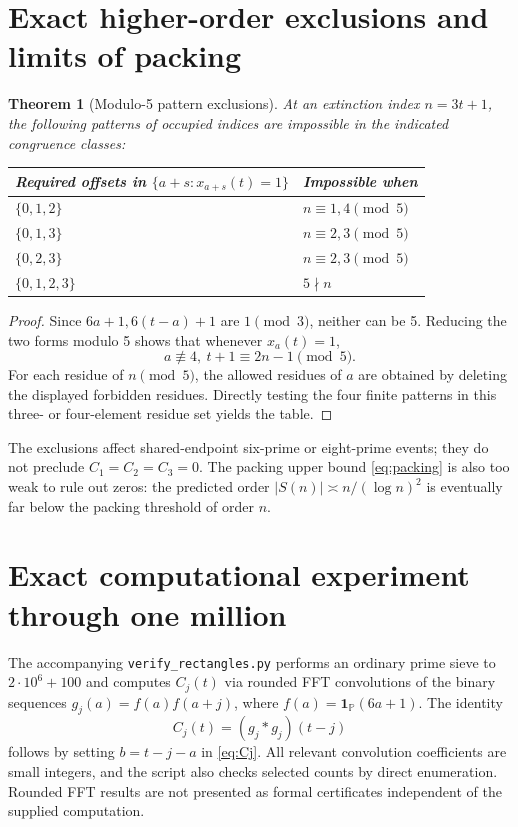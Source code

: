\documentclass[11pt,a4paper]{article}
\newtheorem{theorem}{Theorem}[section]
\theoremstyle{definition}
\newcommand{\PP}{\mathbb P}
\newcommand{\one}{\mathbf 1}
\begin{document}
\section{Exact higher-order exclusions and limits of packing}
\begin{theorem}[Modulo-5 pattern exclusions]\label{thm:mod5pattern}
At an extinction index $n=3t+1$, the following patterns of occupied indices are impossible in the indicated congruence classes:
\begin{center}
\begin{tabular}{@{}l l@{}}
\toprule
Required offsets in $\{a+s:x_{a+s}(t)=1\}$ & Impossible when\\
\midrule
$\{0,1,2\}$ & $n\equiv1,4\pmod5$\\
$\{0,1,3\}$ & $n\equiv2,3\pmod5$\\
$\{0,2,3\}$ & $n\equiv2,3\pmod5$\\
$\{0,1,2,3\}$ & $5\nmid n$\\
\bottomrule
\end{tabular}
\end{center}
\end{theorem}
\begin{proof}
Since $6a+1,6(t-a)+1$ are $1\pmod3$, neither can be 5. Reducing the two forms modulo 5 shows that whenever $x_a(t)=1$,
\begin{equation}\label{eq:aforb}
 a\not\equiv 4,\ t+1\equiv2n-1\pmod5.
\end{equation}
For each residue of $n\pmod5$, the allowed residues of $a$ are obtained by deleting the displayed forbidden residues. Directly testing the four finite patterns in this three- or four-element residue set yields the table.
\end{proof}

The exclusions affect shared-endpoint six-prime or eight-prime events; they do not preclude $C_1=C_2=C_3=0$. The packing upper bound \eqref{eq:packing} is also too weak to rule out zeros: the predicted order $|S(n)|\asymp n/(\log n)^2$ is eventually far below the packing threshold of order $n$.

\section{Exact computational experiment through one million}
The accompanying \texttt{verify\_rectangles.py} performs an ordinary prime sieve to $2\cdot10^6+100$ and computes $C_j(t)$ via rounded FFT convolutions of the binary sequences $g_j(a)=f(a)f(a+j)$, where $f(a)=\one_{\PP}(6a+1)$. The identity
\[
 C_j(t)=(g_j*g_j)(t-j)
\]
follows by setting $b=t-j-a$ in \eqref{eq:Cj}. All relevant convolution coefficients are small integers, and the script also checks selected counts by direct enumeration. Rounded FFT results are not presented as formal certificates independent of the supplied computation.
\end{document}
